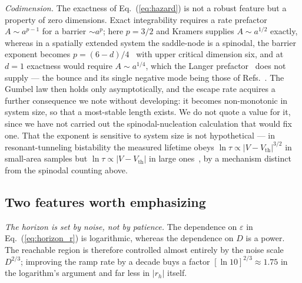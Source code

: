 \documentclass[%
 aip,
 cha,
 amsmath,amssymb,
 reprint,
 superscriptaddress,
 floatfix,
]{revtex4-2}
\begin{document}
\emph{Codimension.}  The exactness of Eq.~(\ref{eq:hazard}) is not a robust feature but a property of zero dimensions.  Exact integrability requires a rate prefactor $A\sim a^{p-1}$ for a barrier $\sim a^{p}$; here $p=3/2$ and Kramers supplies $A\sim a^{1/2}$ exactly, whereas in a spatially extended system the saddle-node is a spinodal, the barrier exponent becomes $p=(6-d)/4$~\cite{UngerKlein1984} with upper critical dimension six, and at $d=1$ exactness would require $A\sim a^{1/4}$, which the Langer prefactor~\cite{Langer1969} does not supply --- the bounce and its single negative mode being those of Refs.~\cite{Coleman1977,CallanColeman1977}.  The Gumbel law then holds only asymptotically, and the escape rate acquires a further consequence we note without developing: it becomes non-monotonic in system size, so that a most-stable length exists.  We do not quote a value for it, since we have not carried out the spinodal-nucleation calculation that would fix one.  That the exponent is sensitive to system size is not hypothetical --- in resonant-tunneling bistability the measured lifetime obeys $\ln\tau\propto|V-V_{\mathrm{th}}|^{3/2}$ in small-area samples but $\ln\tau\propto|V-V_{\mathrm{th}}|$ in large ones~\cite{Tretiakov2003}, by a mechanism distinct from the spinodal counting above.

\subsection{Two features worth emphasizing}

\emph{The horizon is set by noise, not by patience.}  The dependence on $\varepsilon$ in Eq.~(\ref{eq:horizon_r}) is logarithmic, whereas the dependence on $D$ is a power.  The reachable region is therefore controlled almost entirely by the noise scale $D^{2/3}$; improving the ramp rate by a decade buys a factor $[\ln 10]^{2/3}\approx1.75$ in the logarithm's argument and far less in $|r_h|$ itself.
\end{document}
